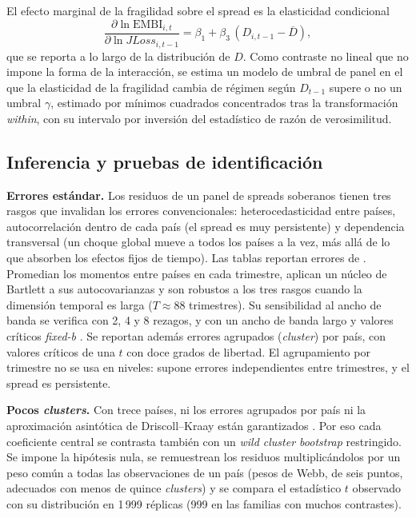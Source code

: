 El efecto marginal de la fragilidad sobre el spread es la elasticidad condicional
\[ \frac{\partial\ln\mathrm{EMBI}_{i,t}}{\partial\ln JLoss_{i,t-1}}=\beta_1+\beta_3\,(D_{i,t-1}-\overline D), \]
que se reporta a lo largo de la distribución de $D$. Como contraste no lineal que no impone la forma de la interacción, se estima un modelo de umbral de panel \citep{Hansen1999,Hansen2000} en el que la elasticidad de la fragilidad cambia de régimen según $D_{t-1}$ supere o no un umbral $\gamma$, estimado por mínimos cuadrados concentrados tras la transformación \textit{within}, con su intervalo por inversión del estadístico de razón de verosimilitud.

\subsection{Inferencia y pruebas de identificación}
\label{sec:est-inferencia}

\textbf{Errores estándar.} Los residuos de un panel de spreads soberanos tienen tres rasgos que invalidan los errores convencionales: heterocedasticidad entre países, autocorrelación dentro de cada país (el spread es muy persistente) y dependencia transversal (un choque global mueve a todos los países a la vez, más allá de lo que absorben los efectos fijos de tiempo). Las tablas reportan errores de \citet{DriscollKraay1998}. Promedian los momentos entre países en cada trimestre, aplican un núcleo de Bartlett a sus autocovarianzas y son robustos a los tres rasgos cuando la dimensión temporal es larga ($T\approx88$ trimestres). Su sensibilidad al ancho de banda se verifica con 2, 4 y 8 rezagos, y con un ancho de banda largo y valores críticos \textit{fixed-b} \citep{KieferVogelsang2005}. Se reportan además errores agrupados (\textit{cluster}) por país, con valores críticos de una $t$ con doce grados de libertad. El agrupamiento por trimestre no se usa en niveles: supone errores independientes entre trimestres, y el spread es persistente.

\textbf{Pocos \textit{clusters}.} Con trece países, ni los errores agrupados por país ni la aproximación asintótica de Driscoll--Kraay están garantizados \citep{CameronGelbachMiller2008}. Por eso cada coeficiente central se contrasta también con un \textit{wild cluster bootstrap} restringido. Se impone la hipótesis nula, se remuestrean los residuos multiplicándolos por un peso común a todas las observaciones de un país (pesos de Webb, de seis puntos, adecuados con menos de quince \textit{clusters}) y se compara el estadístico $t$ observado con su distribución en 1\,999 réplicas (999 en las familias con muchos contrastes). 

